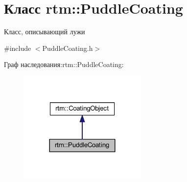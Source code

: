 \hypertarget{classrtm_1_1_puddle_coating}{}\section{Класс rtm\+:\+:Puddle\+Coating}
\label{classrtm_1_1_puddle_coating}


Класс, описывающий лужи  




{\ttfamily \#include $<$Puddle\+Coating.\+h$>$}



Граф наследования\+:rtm\+:\+:Puddle\+Coating\+:
\nopagebreak
\begin{figure}[H]
\begin{center}
\leavevmode
\includegraphics[width=180pt]{classrtm_1_1_puddle_coating__inherit__graph}
\end{center}
\end{figure}
